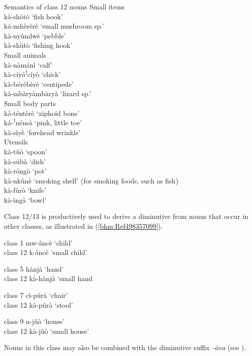 \ea
\label{bkm:Ref99545195}
  Semantics of class 12 nouns
\ea
{}
Small items \\
kà-shòtò \tab ‘fish hook’\\
ká-nshèrèrè \tab ‘small mushroom sp.’\\
kà-nyùndwè \tab ‘pebble’\\
kà-shùtò \tab ‘fishing hook’\\
\ex Small animals \\
kà-nàmánì \tab ‘calf’\\
kà-cíyóꜝcíyò \tab ‘chick’\\
kà-bérèbèrè \tab ‘centipede’\\
kà-mbàryàmbàryà \tab ‘lizard sp.’\\
\ex Small body parts \\
kà-téntèrè \tab ‘xiphoid bone’\\
ká-ꜝnénsà \tab ‘pink, little toe’\\
kà-sîyè \tab ‘forehead wrinkle’\\
\ex Utensils \\
kà-tûò \tab ‘spoon’\\
kà-sûbà \tab ‘dish’\\
kà-róngò \tab ‘pot’\\
kà-nkúnè \tab ‘smoking shelf’ (for smoking foods, such as fish)\\
kà-fùrò \tab ‘knife’\\
kà-ìngà \tab ‘bowl’\\
\z\z


Class 12/13 is productively used to derive a diminutive from nouns that occur in other classes, as illustrated in (\ref{bkm:Ref498357099}).

\ea
\label{bkm:Ref498357099}

\ea
  class 1      mw-âncè    ‘child’\\
class 12    k-âncè    ‘small child’

\ex
  class 5      hànjà      ‘hand’\\
class 12    kà-hànjà    ‘small hand

\ex
  class 7      cì-púrà    ‘chair’\\
class 12    kà-púrà    ‘stool’

\ex
  class 9      n-jûò      ‘house’\\
class 12    kà-jûò      ‘small house’
\z\z

Nouns in this class may also be combined with the diminutive suffix \textit{-ána} (see ).


